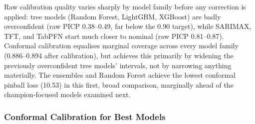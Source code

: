 \begin{table}[h]
\centering
\footnotesize
{}
\caption{First-stage uncertainty comparison, T4/T9 pooled test rows (Tower 2 lacked sufficient
calibration support). Raw quantiles as produced by each model, and the same after leave-one-anchor-
out conformal calibration.}
\end{table}

Raw calibration quality varies sharply by model family before any correction is applied: tree models
(Random Forest, LightGBM, XGBoost) are badly overconfident (raw PICP 0.38--0.49, far below the 0.90
target), while SARIMAX, TFT, and TabPFN start much closer to nominal (raw PICP 0.81--0.87). Conformal
calibration equalises marginal coverage across every model family (0.886--0.894 after calibration),
but achieves this primarily by widening the previously overconfident tree models' intervals, not by
narrowing anything materially. The ensembles and Random Forest achieve the lowest conformal pinball
loss (10.53) in this first, broad comparison, marginally ahead of the champion-focused models
examined next.

\subsubsection{Conformal Calibration for Best Models}

